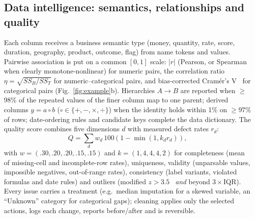 \documentclass[conference]{IEEEtran}
\begin{document}
\subsection{Data intelligence: semantics, relationships and quality}
Each column receives a business semantic type (money, quantity, rate, score, duration, geography, product, outcome, flag) from name tokens and values. Pairwise association is put on a common $[0,1]$ scale: $|r|$ (Pearson, or Spearman when clearly monotone-nonlinear) for numeric pairs, the correlation ratio $\eta=\sqrt{SS_B/SS_T}$ for numeric--categorical pairs, and bias-corrected Cram\'er's V~\cite{bergsma2013} for categorical pairs (Fig.~\ref{fig:example}b). Hierarchies $A\!\to\!B$ are reported when $\geq$98\% of the repeated values of the finer column map to one parent; derived columns $y=a\circ b$ ($\circ\in\{+,-,\times,\div\}$) when the identity holds within 1\% on $\geq$97\% of rows; date-ordering rules and candidate keys complete the data dictionary. The quality score combines five dimensions $d$ with measured defect rates $r_d$:
\begin{equation}
Q=\textstyle\sum_{d} w_d\,100\left(1-\min(1,k_d r_d)\right),
\end{equation}
with $w=(.30,.20,.20,.15,.15)$ and $k=(1,4,4,4,2)$ for completeness (mean of missing-cell and incomplete-row rates), uniqueness, validity (unparsable values, impossible negatives, out-of-range rates), consistency (label variants, violated formulas and date rules) and outliers (modified $z>3.5$~\cite{iglewicz1993} \emph{and} beyond $3\times$IQR). Every issue carries a treatment (e.g.\ median imputation for a skewed variable, an ``Unknown'' category for categorical gaps); cleaning applies only the selected actions, logs each change, reports before/after and is reversible.
\end{document}
